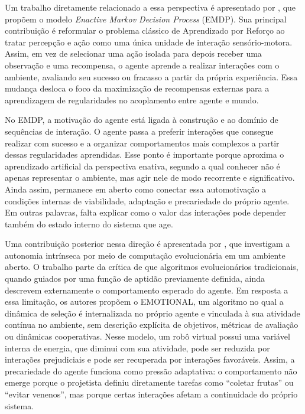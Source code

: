 Um trabalho diretamente relacionado a essa perspectiva é apresentado por , que propõem o modelo \textit{Enactive Markov Decision Process} (EMDP). Sua principal contribuição é reformular o problema clássico de Aprendizado por Reforço ao tratar percepção e ação como uma única unidade de interação sensório-motora. Assim, em vez de selecionar uma ação isolada para depois receber uma observação e uma recompensa, o agente aprende a realizar interações com o ambiente, avaliando seu sucesso ou fracasso a partir da própria experiência. Essa mudança desloca o foco da maximização de recompensas externas para a aprendizagem de regularidades no acoplamento entre agente e mundo.

No EMDP, a motivação do agente está ligada à construção e ao domínio de sequências de interação. O agente passa a preferir interações que consegue realizar com sucesso e a organizar comportamentos mais complexos a partir dessas regularidades aprendidas. Esse ponto é importante porque aproxima o aprendizado artificial da perspectiva enativa, segundo a qual conhecer não é apenas representar o ambiente, mas agir nele de modo recorrente e significativo. Ainda assim, permanece em aberto como conectar essa automotivação a condições internas de viabilidade, adaptação e precariedade do próprio agente. Em outras palavras, falta explicar como o valor das interações pode depender também do estado interno do sistema que age.

Uma contribuição posterior nessa direção é apresentada por , que investigam a autonomia intrínseca por meio de computação evolucionária em um ambiente aberto. O trabalho parte da crítica de que algoritmos evolucionários tradicionais, quando guiados por uma função de aptidão previamente definida, ainda descrevem externamente o comportamento esperado do agente. Em resposta a essa limitação, os autores propõem o EMOTIONAL, um algoritmo no qual a dinâmica de seleção é internalizada no próprio agente e vinculada à sua atividade contínua no ambiente, sem descrição explícita de objetivos, métricas de avaliação ou dinâmicas cooperativas. Nesse modelo, um robô virtual possui uma variável interna de energia, que diminui com sua atividade, pode ser reduzida por interações prejudiciais e pode ser recuperada por interações favoráveis. Assim, a precariedade do agente funciona como pressão adaptativa: o comportamento não emerge porque o projetista definiu diretamente tarefas como ``coletar frutas'' ou ``evitar venenos'', mas porque certas interações afetam a continuidade do próprio sistema.

